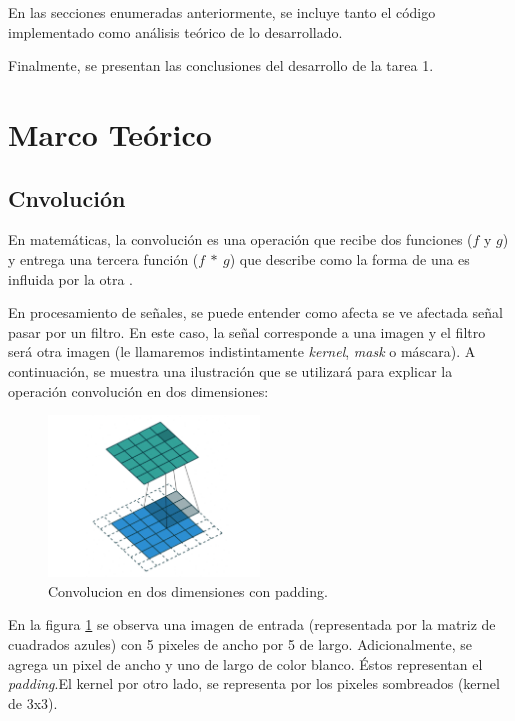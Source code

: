 \documentclass[12pt, letterpaper]{article}
\begin{document}
\par En las secciones enumeradas anteriormente, se incluye tanto el código implementado como análisis teórico de lo desarrollado. 

\par Finalmente, se presentan las conclusiones del desarrollo de la tarea 1. 

\newpage
\section{Marco Teórico}
\subsection{Cnvolución}

\par En matemáticas, la convolución es una operación que recibe dos funciones ($f$ y $g$) y entrega una tercera función ($f \: \ast \: g $) que describe como la forma de una es influida por la otra \cite{WikiConv}.
\par En procesamiento de señales, se puede entender como afecta se ve afectada señal  pasar por un filtro. En este caso, la señal corresponde a una imagen y el filtro será otra imagen (le llamaremos indistintamente \textit{kernel}, \textit{mask} o máscara). A continuación, se muestra una ilustración que se utilizará para explicar la operación convolución en dos dimensiones:

\begin{figure}[H]
  \centering
  \includegraphics[width = 0.5\textwidth]{conv2d.png}
  \caption{Convolucion en dos dimensiones con padding.\cite{imConv2d}}
  \label{fig:conv2d}
\end{figure}

\par En la figura \ref{fig:conv2d} se observa una imagen de entrada (representada por la matriz de cuadrados azules) con 5 pixeles de ancho por 5 de largo. Adicionalmente, se agrega un pixel de ancho y uno de largo de color blanco. Éstos representan el \textit{padding}.El kernel por otro lado, se representa por los pixeles sombreados (kernel de 3x3).
\end{document}
